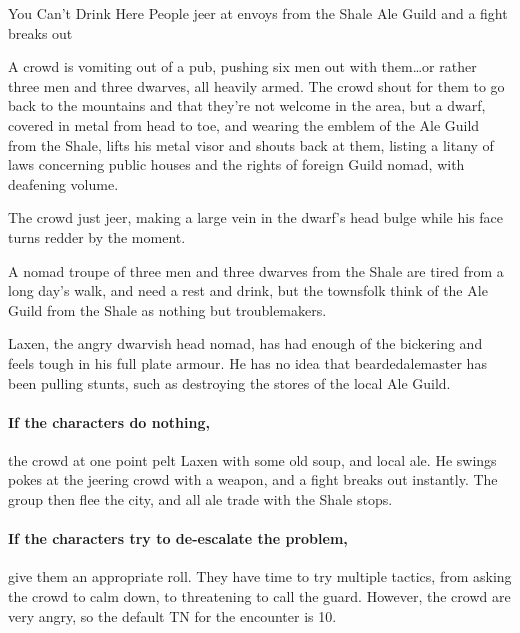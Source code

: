 \begin{multicols}{2}
{You Can't Drink Here}%
{People jeer at envoys from the Shale Ale Guild and a fight breaks out}%

\begin{boxtext}

  A crowd is vomiting out of a pub, pushing six men out with them\ldots or rather three men and three dwarves, all heavily armed.
  The crowd shout for them to go back to the mountains and that they're not welcome in the area, but a dwarf, covered in metal from head to toe, and wearing the emblem of the Ale Guild from the Shale, lifts his metal visor and shouts back at them, listing a litany of laws concerning public houses and the rights of foreign Guild \gls{nomad}, with deafening volume.

  The crowd just jeer, making a large vein in the dwarf's head bulge while his face turns redder by the moment.

\end{boxtext}

A \gls{nomad} troupe of three men and three dwarves from the Shale are tired from a long day's walk, and need a rest and drink, but the townsfolk think of the Ale Guild from the Shale as nothing but troublemakers.

Laxen, the angry dwarvish head \gls{nomad}, has had enough of the bickering and feels tough in his full plate armour.
He has no idea that \gls{beardedalemaster} has been pulling stunts, such as destroying the stores of the local Ale Guild.

\paragraph{If the characters do nothing,}
the crowd at one point pelt Laxen with some old soup, and local ale.
He swings pokes at the jeering crowd with a weapon, and a fight breaks out instantly.
The group then flee the city, and all ale trade with the Shale stops.

\paragraph{If the characters try to de-escalate the problem,}
give them an appropriate roll.
They have time to try multiple tactics, from asking the crowd to calm down, to threatening to call the guard.
However, the crowd are very angry, so the default TN for the encounter is 10.



\end{multicols}
